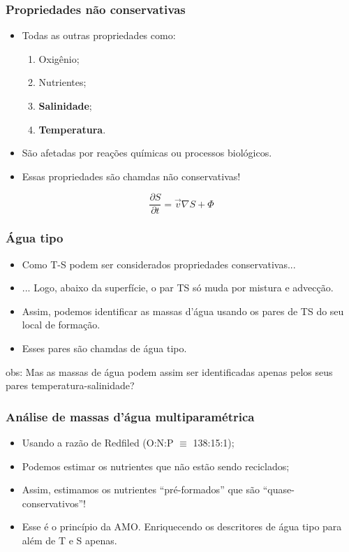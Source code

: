 \begin{frame}
\frametitle{Propriedades não conservativas}
  \begin{itemize}[<+-| alert@+>]
    \item Todas as outras propriedades como:
      \begin{enumerate}[<+-| alert@+>]
        \item Oxigênio;
        \item Nutrientes;
        \item {\bf Salinidade};
        \item {\bf Temperatura}.
      \end{enumerate}
      \item São afetadas por reações químicas ou processos biológicos.
      \item Essas propriedades são chamdas não conservativas!
  \end{itemize}
    \pause
    \begin{block}{}
      $$\frac{\partial S}{\partial t} = \vec{v}\nabla{S} + \Phi$$
    \end{block}
\end{frame}


\begin{frame}
\frametitle{Água tipo}
  \begin{itemize}[<+-| alert@+>]
    \item Como T-S podem ser considerados propriedades conservativas...
    \item ... Logo, abaixo da superfície, o par TS só muda por mistura e
          advecção.
    \item Assim, podemos identificar as massas d'água usando os pares de TS
          do seu local de formação.
    \item Esses pares são chamdas de água tipo.
  \end{itemize}
  \pause
    obs: Mas as massas de água podem assim ser identificadas apenas pelos seus pares temperatura-salinidade?
\end{frame}


\begin{frame}
\frametitle{Análise de massas d'água multiparamétrica}
  \begin{itemize}[<+-| alert@+>]
    \item Usando a razão de Redfiled (O:N:P $\equiv$ 138:15:1);
    \item Podemos estimar os nutrientes que não estão sendo reciclados;
    \item Assim, estimamos os nutrientes ``pré-formados'' que são ``quase-
          conservativos''!
    \item Esse é o princípio da AMO.  Enriquecendo os descritores de água tipo
          para além de T e S apenas.
  \end{itemize}
\end{frame}

